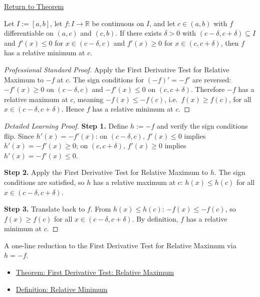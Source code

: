 \newpage
{}
\label{prf:first-derivative-test-minimum}

\begin{remark*}[Return]
\hyperref[thm:first-derivative-test-minimum]{Return to Theorem}
\end{remark*}

\begin{theorem*}
Let $I := [a,b]$, let $f : I \to \mathbb{R}$ be continuous on $I$, and let $c \in (a,b)$ with $f$ differentiable on $(a,c)$ and $(c,b)$. If there exists $\delta > 0$ with $(c-\delta,c+\delta) \subseteq I$ and $f'(x) \leq 0$ for $x \in (c-\delta,c)$ and $f'(x) \geq 0$ for $x \in (c,c+\delta)$, then $f$ has a relative minimum at $c$.
\end{theorem*}

\begin{proof}[Professional Standard Proof]
\LRAProofBodyStart
Apply the First Derivative Test for Relative Maximum to $-f$ at $c$. The sign conditions for $(-f)'= -f'$ are reversed: $-f'(x) \geq 0$ on $(c-\delta,c)$ and $-f'(x) \leq 0$ on $(c,c+\delta)$. Therefore $-f$ has a relative maximum at $c$, meaning $-f(x) \leq -f(c)$, i.e.\ $f(x) \geq f(c)$, for all $x \in (c-\delta,c+\delta)$. Hence $f$ has a relative minimum at $c$.
\end{proof}

\begin{proof}[Detailed Learning Proof]
\LRAProofBodyStart

\textbf{Step 1.} Define $h := -f$ and verify the sign conditions flip. Since $h'(x) = -f'(x)$: on $(c-\delta,c)$, $f'(x) \leq 0$ implies $h'(x) = -f'(x) \geq 0$; on $(c,c+\delta)$, $f'(x) \geq 0$ implies $h'(x) = -f'(x) \leq 0$.

\textbf{Step 2.} Apply the First Derivative Test for Relative Maximum to $h$. The sign conditions are satisfied, so $h$ has a relative maximum at $c$: $h(x) \leq h(c)$ for all $x \in (c-\delta,c+\delta)$.

\textbf{Step 3.} Translate back to $f$. From $h(x) \leq h(c)$: $-f(x) \leq -f(c)$, so $f(x) \geq f(c)$ for all $x \in (c-\delta,c+\delta)$. By definition, $f$ has a relative minimum at $c$.
\end{proof}

\begin{remark*}
A one-line reduction to the First Derivative Test for Relative Maximum via $h = -f$.
\end{remark*}

\begin{dependencies}
\begin{itemize}
  \item \hyperref[thm:first-derivative-test-maximum]{Theorem: First Derivative Test: Relative Maximum}
  \item \hyperref[def:relative-minimum]{Definition: Relative Minimum}
\end{itemize}
\end{dependencies}

\clearpage
